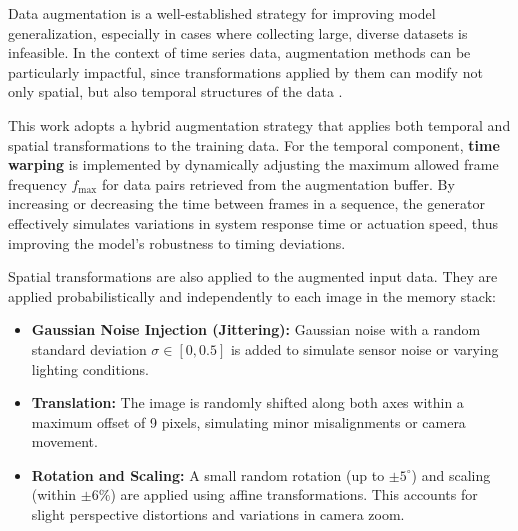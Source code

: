 Data augmentation is a well-established strategy for improving model generalization, especially in cases where collecting large, diverse datasets is infeasible. In the context of time series data, augmentation methods can be particularly impactful, since transformations applied by them can modify not only spatial, but also temporal structures of the data \autocite{iglesias2023data}.

This work adopts a hybrid augmentation strategy that applies both temporal and spatial transformations to the training data. For the temporal component, \textbf{time warping} is implemented by dynamically adjusting the maximum allowed frame frequency \( f_{\text{max}} \) for data pairs retrieved from the augmentation buffer. By increasing or decreasing the time between frames in a sequence, the generator effectively simulates variations in system response time or actuation speed, thus improving the model's robustness to timing deviations.

Spatial transformations are also applied to the augmented input data. They are applied probabilistically and independently to each image in the memory stack:

\begin{itemize}
  \item \textbf{Gaussian Noise Injection (Jittering):} Gaussian noise with a random standard deviation \( \sigma \in [0, 0.5] \) is added to simulate sensor noise or varying lighting conditions.
  \item \textbf{Translation:} The image is randomly shifted along both axes within a maximum offset of 9 pixels, simulating minor misalignments or camera movement.
  \item \textbf{Rotation and Scaling:} A small random rotation (up to \( \pm 5^\circ \)) and scaling (within \( \pm 6\% \)) are applied using affine transformations. This accounts for slight perspective distortions and variations in camera zoom.
\end{itemize}

